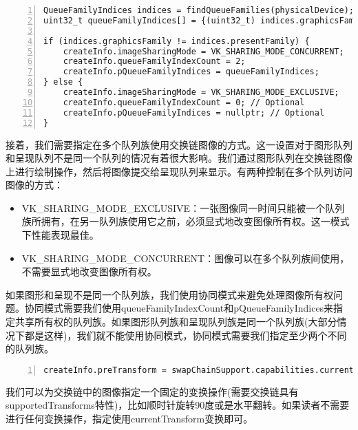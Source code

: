 \documentclass{ctexart}
\begin{document}
\begin{lstlisting}[language={[ANSI]C},keywordstyle=\color{blue!70},commentstyle=\color{red!50!green!50!blue!50},frame=shadowbox, rulesepcolor=\color{red!20!green!20!blue!20},basicstyle=\small,numbers=left, numberstyle=\tiny,breaklines=true]
QueueFamilyIndices indices = findQueueFamilies(physicalDevice);
uint32_t queueFamilyIndices[] = {(uint32_t) indices.graphicsFamily, (uint32_t) indices.presentFamily};

if (indices.graphicsFamily != indices.presentFamily) {
	createInfo.imageSharingMode = VK_SHARING_MODE_CONCURRENT;
	createInfo.queueFamilyIndexCount = 2;
	createInfo.pQueueFamilyIndices = queueFamilyIndices;
} else {
	createInfo.imageSharingMode = VK_SHARING_MODE_EXCLUSIVE;
	createInfo.queueFamilyIndexCount = 0; // Optional
	createInfo.pQueueFamilyIndices = nullptr; // Optional
}
\end{lstlisting}

接着，我们需要指定在多个队列族使用交换链图像的方式。这一设置对于图形队列和呈现队列不是同一个队列的情况有着很大影响。我们通过图形队列在交换链图像上进行绘制操作，然后将图像提交给呈现队列来显示。有两种控制在多个队列访问图像的方式：

\begin{itemize}
	\item VK\_SHARING\_MODE\_EXCLUSIVE：一张图像同一时间只能被一个队列族所拥有，在另一队列族使用它之前，必须显式地改变图像所有权。这一模式下性能表现最佳。
	\item VK\_SHARING\_MODE\_CONCURRENT：图像可以在多个队列族间使用，不需要显式地改变图像所有权。
\end{itemize}

如果图形和呈现不是同一个队列族，我们使用协同模式来避免处理图像所有权问题。协同模式需要我们使用queueFamilyIndexCount和pQueueFamilyIndices来指定共享所有权的队列族。如果图形队列族和呈现队列族是同一个队列族(大部分情况下都是这样)，我们就不能使用协同模式，协同模式需要我们指定至少两个不同的队列族。

\begin{lstlisting}[language={[ANSI]C},keywordstyle=\color{blue!70},commentstyle=\color{red!50!green!50!blue!50},frame=shadowbox, rulesepcolor=\color{red!20!green!20!blue!20},basicstyle=\small,numbers=left, numberstyle=\tiny,breaklines=true]
createInfo.preTransform = swapChainSupport.capabilities.currentTransform;
\end{lstlisting}

我们可以为交换链中的图像指定一个固定的变换操作(需要交换链具有supportedTransforms特性)，比如顺时针旋转90度或是水平翻转。如果读者不需要进行任何变换操作，指定使用currentTransform变换即可。
\end{document}
